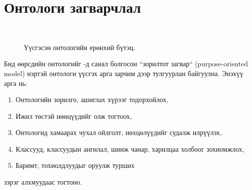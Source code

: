 \documentclass[conference, a4paper, mongolian]{myIEEEtran}
\begin{document}
\section{Онтологи загварчлал}
%
\begin{figure}[t]
	\centering
	 \\
	\hfil
	\caption{Үүсгэсэн онтологийн ерөнхий бүтэц.}
	\label{figure:ontology}
\end{figure}
%
Бид өөрсдийн онтологийг \cite{bib:7}-д санал болгосон ``зорилтот загвар`` (purpose-oriented model) нэртэй онтологи үүсгэх арга зарчим дээр тулгуурлан байгуулна. Энэхүү арга нь:
%
\begin{enumerate}
	\item Онтологийн зорилго, ашиглах хүрээг тодорхойлох,
	\item Ижил төстэй нөөцүүдийг олж тогтоох,
	\item Онтологид хамаарах чухал ойлголт, нөхцөлүүдийг судалж илрүүлэх,
	\item Классууд, классуудын ангилал, шинж чанар, харилцаа холбоог зохиомжлох,
	\item Баримт, тохиолдлуудыг оруулж турших
\end{enumerate}
зэрэг алхмуудаас тогтоно.
%
\end{document}

